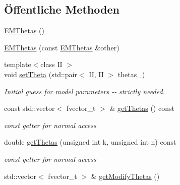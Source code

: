 \subsection*{Öffentliche Methoden}
\begin{DoxyCompactItemize}
\item 
\hyperlink{classCDA_1_1EMThetas_a97b7888efc058416d40ab7a24c80a2a0}{EMThetas} ()
\item 
\hyperlink{classCDA_1_1EMThetas_aaa3c2d20ee5d95a8b38d40e7c6d0b1a7}{EMThetas} (const \hyperlink{classCDA_1_1EMThetas}{EMThetas} \&other)
\item 
{\footnotesize template$<$class II $>$ }\\void \hyperlink{classCDA_1_1EMThetas_a1c8058269e4d8a32a2dd58f13ad94369}{setTheta} (std::pair$<$ II, II $>$ thetas\_\-)
\begin{DoxyCompactList}\small\item\em Initial guess for model parameters -\/-\/ strictly needed. \item\end{DoxyCompactList}\item 
\hypertarget{classCDA_1_1EMThetas_aadd9127ef459eda6eb890e1f3bd5a1bc}{
const std::vector$<$ fvector\_\-t $>$ \& \hyperlink{classCDA_1_1EMThetas_aadd9127ef459eda6eb890e1f3bd5a1bc}{getThetas} () const }
\label{classCDA_1_1EMThetas_aadd9127ef459eda6eb890e1f3bd5a1bc}

\begin{DoxyCompactList}\small\item\em const getter for normal access \item\end{DoxyCompactList}\item 
\hypertarget{classCDA_1_1EMThetas_a0d5cc0f815c7a78a42d2d64b2fd5bfdb}{
double \hyperlink{classCDA_1_1EMThetas_a0d5cc0f815c7a78a42d2d64b2fd5bfdb}{getThetas} (unsigned int k, unsigned int n) const }
\label{classCDA_1_1EMThetas_a0d5cc0f815c7a78a42d2d64b2fd5bfdb}

\begin{DoxyCompactList}\small\item\em const getter for normal access \item\end{DoxyCompactList}\item 
\hypertarget{classCDA_1_1EMThetas_ab5cc3d05862d41aa16a38b7c4ec51bd3}{
std::vector$<$ fvector\_\-t $>$ \& \hyperlink{classCDA_1_1EMThetas_ab5cc3d05862d41aa16a38b7c4ec51bd3}{getModifyThetas} ()}
\label{classCDA_1_1EMThetas_ab5cc3d05862d41aa16a38b7c4ec51bd3}


\end{DoxyCompactItemize}
